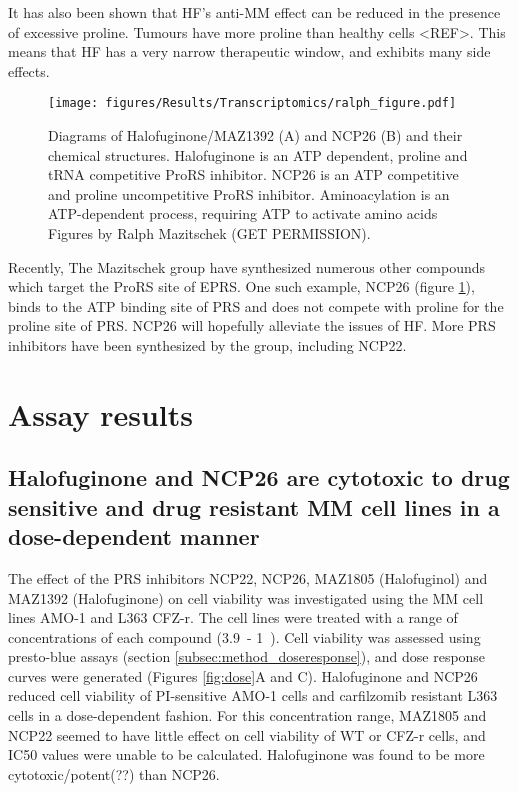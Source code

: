 It has also been shown that HF's anti-MM effect can be reduced in the presence of excessive proline.
Tumours have more proline than healthy cells <REF>.
This means that HF has a very narrow therapeutic window, and exhibits many side effects.

\begin{figure}[ht]
    \centering
    \texttt{[image: figures/Results/Transcriptomics/ralph\_figure.pdf]}
    \caption[Halofuginone and NCP26 structures]{Diagrams of Halofuginone/MAZ1392 (A) and NCP26 (B) and their chemical structures.
    Halofuginone is an ATP dependent, proline and tRNA competitive ProRS inhibitor.
    NCP26 is an ATP competitive and proline uncompetitive ProRS inhibitor.
    Aminoacylation is an ATP-dependent process, requiring ATP to activate amino acids
    Figures by Ralph Mazitschek (GET PERMISSION).
    }
    \label{fig:ralph_diagrams}
\end{figure}

Recently, The Mazitschek group have synthesized numerous other compounds which target the ProRS site of EPRS.
One such example, NCP26 (figure \ref{fig:ralph_diagrams}), binds to the ATP binding site of PRS and does not compete with proline for the proline site of PRS.
NCP26 will hopefully alleviate the issues of HF\@.
More PRS inhibitors have been synthesized by the group, including NCP22.

\clearpage

\section{Assay results}

\subsection{Halofuginone and NCP26 are cytotoxic to drug sensitive and drug resistant MM cell lines in a dose-dependent manner}
The effect of the PRS inhibitors NCP22, NCP26, MAZ1805 (Halofuginol) and MAZ1392 (Halofuginone) on cell viability was investigated using the MM cell lines AMO-1 and L363 CFZ-r.
The cell lines were treated with a range of concentrations of each compound (3.9\si{\nano\Molar}- 1\si{\micro\Molar}).
Cell viability was assessed using presto-blue assays (section \ref{subsec:method_doseresponse}), and dose response curves were generated (Figures \ref{fig:dose}A and C).
Halofuginone and NCP26 reduced cell viability of PI-sensitive AMO-1 cells and carfilzomib resistant L363 cells in a dose-dependent fashion.
For this concentration range, MAZ1805 and NCP22 seemed to have little effect on cell viability of WT or CFZ-r cells, and IC50 values were unable to be calculated.
Halofuginone was found to be more cytotoxic/potent(??) than NCP26.

